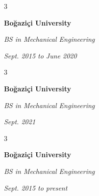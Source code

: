 \documentclass[10pt, letterpaper]{article}
\newenvironment{threecolentry}[3][]{
    \onecolentry
    \def\thirdColumn{#3}
    \setcolumnwidth{0.6 cm, \fill, 4.5 cm}
    \begin{paracol}{3}
    #2 \switchcolumn
}{
    \switchcolumn \raggedleft \thirdColumn
    \end{paracol}
    \endonecolentry
} %
\begin{document}
        \vspace{0.2 cm-3px}

        \begin{threecolentry}{
            \vspace*{\fill}
            \textbullet
            \vspace*{3px}
            \vspace*{\fill}
        }{
            
            
        \textit{Sept. 2015 to June 2020}}
            \textbf{Boğaziçi University}

            \textit{BS in Mechanical Engineering}
        \end{threecolentry}



        \vspace{0.2 cm-3px}

        \begin{threecolentry}{
            \vspace*{\fill}
            \textbullet
            \vspace*{3px}
            \vspace*{\fill}
        }{
            
            
        \textit{Sept. 2021}}
            \textbf{Boğaziçi University}

            \textit{BS in Mechanical Engineering}
        \end{threecolentry}



        \vspace{0.2 cm-3px}

        \begin{threecolentry}{
            \vspace*{\fill}
            \textbullet
            \vspace*{3px}
            \vspace*{\fill}
        }{
            
            
        \textit{Sept. 2015 to present}}
            \textbf{Boğaziçi University}

            \textit{BS in Mechanical Engineering}
        \end{threecolentry}
\end{document}
